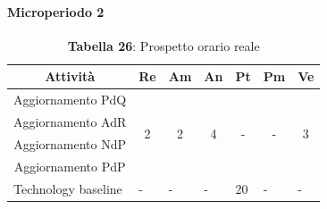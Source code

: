 \paragraph{Microperiodo 2}
\begin{table}[H]
	\centering
	\begin{tabular}{|c|c|c|c|c|c|c|}
		\hline
		\rowcolor{lighter-grayer}
		\textbf{Attività}                         & \textbf{Re}            & \textbf{Am}            & \textbf{An}            & \textbf{Pt}             & \textbf{Pm}            & \textbf{Ve}            \\ \hline
		Aggiornamento PdQ                         & \multirow{4}{*}{2}     & \multirow{4}{*}{2}     & \multirow{4}{*}{4}     & \multirow{4}{*}{-}      & \multirow{4}{*}{-}     & \multirow{4}{*}{3}     \\ \cline{1-1}
		Aggiornamento AdR                         &                        &                        &                        &                         &                        &                        \\ \cline{1-1}
		Aggiornamento NdP                         &                        &                        &                        &                         &                        &                        \\ \cline{1-1}
		Aggiornamento PdP                         &                        &                        &                        &                         &                        &                        \\ \hline
		\multicolumn{1}{|l|}{Technology baseline} & \multicolumn{1}{l|}{-} & \multicolumn{1}{l|}{-} & \multicolumn{1}{l|}{-} & \multicolumn{1}{l|}{20} & \multicolumn{1}{l|}{-} & \multicolumn{1}{l|}{-} \\ \hline
	\end{tabular}
\caption*{\textbf{Tabella 26}: Prospetto orario reale\\}
\end{table}

